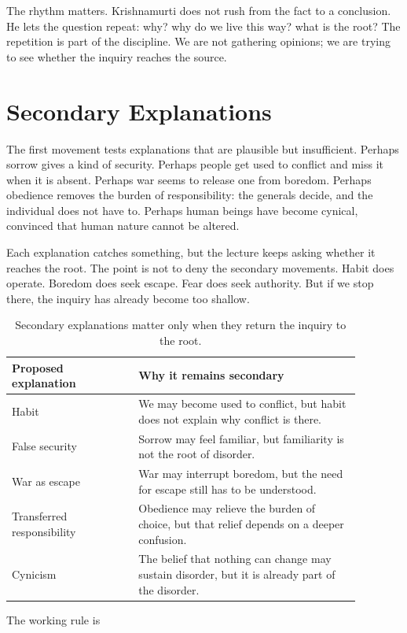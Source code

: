 The rhythm matters. Krishnamurti does not rush from the fact to a conclusion. He lets the question repeat: why? why do we live this way? what is the root? The repetition is part of the discipline. We are not gathering opinions; we are trying to see whether the inquiry reaches the source.

\section{Secondary Explanations}

The first movement tests explanations that are plausible but insufficient. Perhaps sorrow gives a kind of security. Perhaps people get used to conflict and miss it when it is absent. Perhaps war seems to release one from boredom. Perhaps obedience removes the burden of responsibility: the generals decide, and the individual does not have to. Perhaps human beings have become cynical, convinced that human nature cannot be altered.

Each explanation catches something, but the lecture keeps asking whether it reaches the root. The point is not to deny the secondary movements. Habit does operate. Boredom does seek escape. Fear does seek authority. But if we stop there, the inquiry has already become too shallow.

\begin{table}
\centering
\begin{tabular}{p{0.32\linewidth}p{0.56\linewidth}}
\hline
\textbf{Proposed explanation} & \textbf{Why it remains secondary} \\
\hline
Habit & We may become used to conflict, but habit does not explain why conflict is there. \\
False security & Sorrow may feel familiar, but familiarity is not the root of disorder. \\
War as escape & War may interrupt boredom, but the need for escape still has to be understood. \\
Transferred responsibility & Obedience may relieve the burden of choice, but that relief depends on a deeper confusion. \\
Cynicism & The belief that nothing can change may sustain disorder, but it is already part of the disorder. \\
\hline
\end{tabular}
\caption{Secondary explanations matter only when they return the inquiry to the root.}
\end{table}

The working rule is

